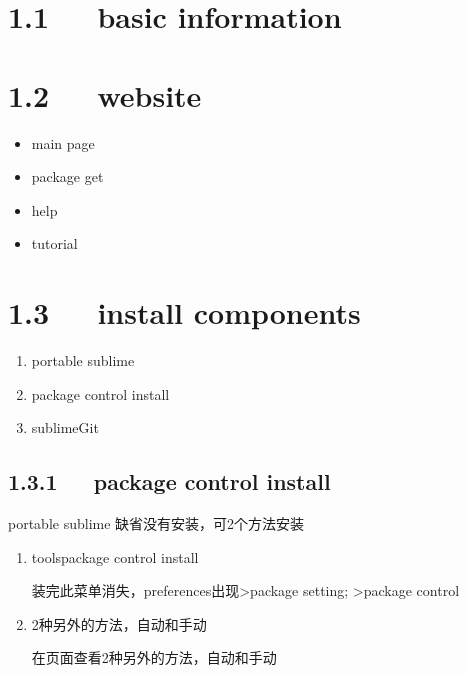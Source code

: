 \documentclass[letterpaper,12pt,english]{sphinxmanual}
\begin{document}
\section{1.1   basic information}
\label{\detokenize{001software/001install/sublime:basic-information}}

\section{1.2   website}
\label{\detokenize{001software/001install/sublime:website}}\begin{itemize}
\item {} 
main page

\item {} 
package get

\item {} 
help

\item {} 
tutorial

\end{itemize}


\section{1.3   install components}
\label{\detokenize{001software/001install/sublime:install-components}}\begin{enumerate}
%
\item {} 
portable sublime

\item {} 
package control install

\item {} 
sublimeGit

\end{enumerate}


\subsection{1.3.1   package control install}
\label{\detokenize{001software/001install/sublime:package-control-install}}
portable sublime 缺省没有安装，可2个方法安装
\begin{enumerate}
%
\item {} 
tools\sphinxhyphen{}package control install

装完此菜单消失，preferences出现\sphinxhyphen{}>package setting; \sphinxhyphen{}>package control

\item {} 
2种另外的方法，自动和手动

在页面查看2种另外的方法，自动和手动

\end{enumerate}
\end{document}

